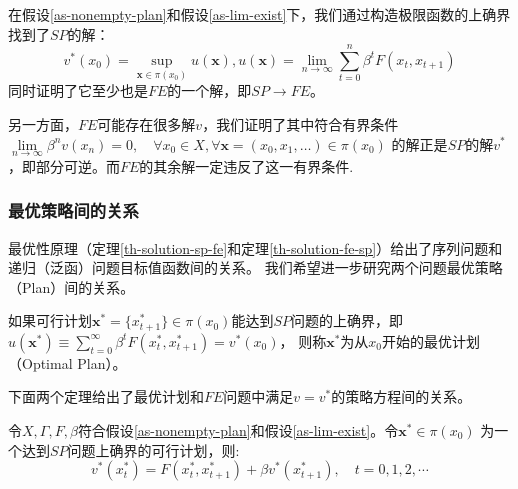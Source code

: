 在假设\ref{as-nonempty-plan}和假设\ref{as-lim-exist}下，我们通过构造极限函数的上确界找到了$SP$的解：
$$
v^*\left(x_0\right)=\sup _{\boldsymbol{x}\in\pi\left(x_0\right)}u\left(\boldsymbol{x}\right), 
u\left(\boldsymbol{x}\right)=\lim_{n\rightarrow\infty}\sum_{t=0}^{n}\beta^t F\left(x_t,x_{t+1}\right)
$$
同时证明了它至少也是$FE$的一个解，即$SP\rightarrow FE$。

另一方面，$FE$可能存在很多解$v$，我们证明了其中符合有界条件
$
\lim\limits_{n\rightarrow \infty}\beta^n v\left(x_n\right)=0, \quad \forall x_0\in X, \forall \boldsymbol{x}=\left(x_0,x_1,\dots\right)\in \pi\left(x_0\right)
$
的解正是$SP$的解$v^*$，即部分可逆。而$FE$的其余解一定违反了这一有界条件.


\subsubsection{最优策略间的关系}

最优性原理（定理\ref{th-solution-sp-fe}和定理\ref{th-solution-fe-sp}）给出了序列问题和递归（泛函）问题目标值函数间的关系。
我们希望进一步研究两个问题最优策略（Plan）间的关系。

\begin{definition}[最优计划]
    如果可行计划$\boldsymbol{x}^* = \{x_{t+1}^*\} \in\pi\left(x_0\right)$能达到$SP$问题的上确界，即
    $u\left(\boldsymbol{x}^*\right) \equiv \sum_{t=0}^{\infty}\beta^t F\left(x_t^*,x_{t+1}^*\right) = v^*\left(x_0\right)$，
    则称$\boldsymbol{x}^*$为从$x_0$开始的最优计划（Optimal Plan）。
\end{definition}
下面两个定理给出了最优计划和$FE$问题中满足$v=v^*$的策略方程间的关系。

\begin{theorem} \label{th-policy-sp-fe}
    令$X, \Gamma, F, \beta$符合假设\ref{as-nonempty-plan}和假设\ref{as-lim-exist}。令$\boldsymbol{x}^*\in \pi\left(x_0\right)$
    为一个达到$SP$问题上确界的可行计划，则:
    \begin{equation} \label{eq-opt-plan-sp}
        v^*\left(x_t^*\right) = F\left(x_t^*,x_{t+1}^*\right) + \beta v^*\left(x_{t+1}^*\right), \quad t=0,1,2,\cdots
    \end{equation}
\end{theorem}

